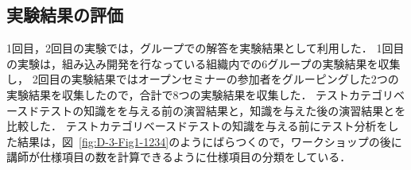 \subsection{実験結果の評価}
1回目，2回目の実験では，グループでの解答を実験結果として利用した．
1回目の実験は，組み込み開発を行なっている組織内での6グループの実験結果を収集し，
2回目の実験結果ではオープンセミナーの参加者をグルーピングした2つの実験結果を収集したので，合計で8つの実験結果を収集した．
テストカテゴリベースドテストの知識をを与える前の演習結果と，知識を与えた後の演習結果とを比較した．
テストカテゴリベースドテストの知識を与える前にテスト分析をした結果は，図~\ref{fig:D-3-Fig1-1234}のようにばらつくので，ワークショップの後に講師が仕様項目の数を計算できるように仕様項目の分類をしている．

